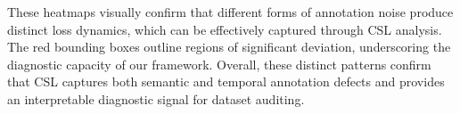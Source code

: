 \documentclass{article}
\theoremstyle{plain}
\theoremstyle{definition}
\theoremstyle{remark}
\begin{document}
These heatmaps visually confirm that different forms of annotation noise produce distinct loss dynamics, which can be effectively captured through CSL analysis. The red bounding boxes outline regions of significant deviation, underscoring the diagnostic capacity of our framework. Overall, these distinct patterns confirm that CSL captures both semantic and temporal annotation defects and provides an interpretable diagnostic signal for dataset auditing. 
\end{document}

